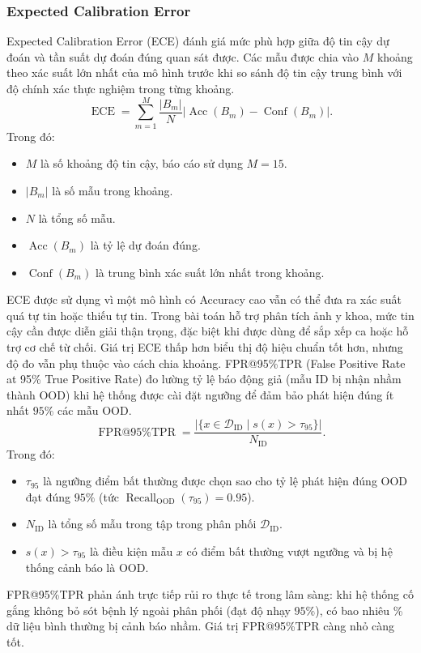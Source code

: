 \subsubsection{Expected Calibration Error}
Expected Calibration Error (ECE) \cite{Guo2017Calibration} đánh giá mức phù hợp giữa độ tin cậy dự đoán và tần suất dự đoán đúng quan sát được. Các mẫu được chia vào $M$ khoảng theo xác suất lớn nhất của mô hình trước khi so sánh độ tin cậy trung bình với độ chính xác thực nghiệm trong từng khoảng.
\begin{equation}\operatorname{ECE}=\sum_{m=1}^{M}\frac{|B_m|}{N}\left|\operatorname{Acc}(B_m)-\operatorname{Conf}(B_m)\right|.\label{eq:ch4_ece}\end{equation}
Trong đó:
\begin{itemize}
    \item $M$ là số khoảng độ tin cậy, báo cáo sử dụng $M=15$.
    \item $|B_m|$ là số mẫu trong khoảng.
    \item $N$ là tổng số mẫu.
    \item $\operatorname{Acc}(B_m)$ là tỷ lệ dự đoán đúng.
    \item $\operatorname{Conf}(B_m)$ là trung bình xác suất lớn nhất trong khoảng.
\end{itemize}
ECE được sử dụng vì một mô hình có Accuracy cao vẫn có thể đưa ra xác suất quá tự tin hoặc thiếu tự tin. Trong bài toán hỗ trợ phân tích ảnh y khoa, mức tin cậy cần được diễn giải thận trọng, đặc biệt khi được dùng để sắp xếp ca hoặc hỗ trợ cơ chế từ chối. Giá trị ECE thấp hơn biểu thị độ hiệu chuẩn tốt hơn, nhưng độ đo vẫn phụ thuộc vào cách chia khoảng.
FPR@95\%TPR \cite{Liang2018ODIN,Liu2020EnergyOOD} (False Positive Rate at 95\% True Positive Rate) đo lường tỷ lệ báo động giả (mẫu ID bị nhận nhầm thành OOD) khi hệ thống được cài đặt ngưỡng để đảm bảo phát hiện đúng ít nhất $95\%$ các mẫu OOD.
\begin{equation}
    \operatorname{FPR@95\%TPR} = \frac{|\{x \in \mathcal{D}_{\mathrm{ID}} \mid s(x) > \tau_{95}\}|}{N_{\mathrm{ID}}}.
    \label{eq:ch4_fpr95}
\end{equation}
Trong đó:
\begin{itemize}
    \item $\tau_{95}$ là ngưỡng điểm bất thường được chọn sao cho tỷ lệ phát hiện đúng OOD đạt đúng $95\%$ (tức $\operatorname{Recall}_{\mathrm{OOD}}(\tau_{95}) = 0.95$).
    \item $N_{\mathrm{ID}}$ là tổng số mẫu trong tập trong phân phối $\mathcal{D}_{\mathrm{ID}}$.
    \item $s(x) > \tau_{95}$ là điều kiện mẫu $x$ có điểm bất thường vượt ngưỡng và bị hệ thống cảnh báo là OOD.
\end{itemize}
FPR@95\%TPR phản ánh trực tiếp rủi ro thực tế trong lâm sàng: khi hệ thống cố gắng không bỏ sót bệnh lý ngoài phân phối (đạt độ nhạy $95\%$), có bao nhiêu \% dữ liệu bình thường bị cảnh báo nhầm. Giá trị FPR@95\%TPR càng nhỏ càng tốt.
